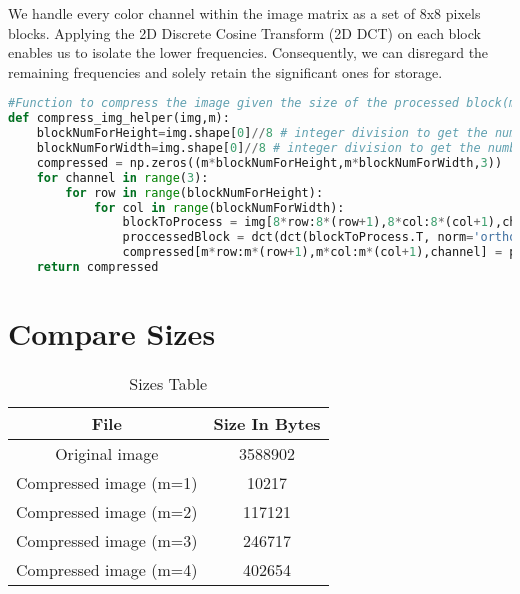 \documentclass{report}
\begin{document}
We handle every color channel within the image matrix as a set of 8x8 pixels blocks. Applying the 2D Discrete Cosine Transform (2D DCT) on each block enables us to isolate the lower frequencies. Consequently, we can disregard the remaining frequencies and solely retain the significant ones for storage.
\lstset{style=mystyle}
\begin{lstlisting}[language=Python, caption=compress image given m,label=lst:compress-img-helper]
#Function to compress the image given the size of the processed block(m)
def compress_img_helper(img,m):
    blockNumForHeight=img.shape[0]//8 # integer division to get the number of 8*8 blocks that can fit in the height of the img
    blockNumForWidth=img.shape[0]//8 # integer division to get the number of 8*8 blocks that can fit in the height of the img
    compressed = np.zeros((m*blockNumForHeight,m*blockNumForWidth,3))
    for channel in range(3):
        for row in range(blockNumForHeight):
            for col in range(blockNumForWidth):
                blockToProcess = img[8*row:8*(row+1),8*col:8*(col+1),channel]
                proccessedBlock = dct(dct(blockToProcess.T, norm='ortho').T, norm='ortho') #2d DCT
                compressed[m*row:m*(row+1),m*col:m*(col+1),channel] = proccessedBlock[:m,:m]
    return compressed
\end{lstlisting}

\newpage

\section{Compare Sizes}
\begin{table}[h]
    \centering
    \caption{Sizes Table}
    \label{tab:Sizes}
    \begin{tabular}{|c|c|} 
        \toprule
        \textbf{File} & \textbf{Size In Bytes} \\ 
        \midrule 
            Original image  & 3588902  \\ \hline
            Compressed image (m=1)  &10217  \\ \hline
            Compressed image (m=2)  & 117121  \\ \hline
            Compressed image (m=3)  & 246717  \\ \hline
            Compressed image (m=4) & 402654  \\ \hline
    \end{tabular}
\end{table}
\end{document}
